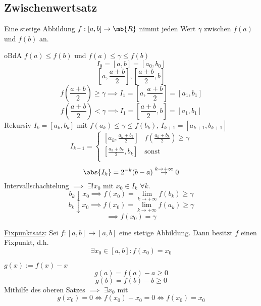 \subsection{Zwischenwertsatz}
\begin{Sat}
  Eine stetige Abbildung $f:[a,b]\to\mb{R}$ nimmt jeden Wert $\gamma$ zwischen $f(a)$ und $f(b)$ an.
\end{Sat}
\begin{Bew}
  oBdA $f(a)\leq f(b)$ und $f(a)\leq \gamma\leq f(b)$
  \[I_0=\left[ a,b \right]=\left[ a_0,b_0 \right]\]
  \[\left[ a,\frac{a+b}{2} \right],\left[ \frac{a+b}{2},b \right]\]
  \[f\left( \frac{a+b}{2} \right)\geq\gamma\implies I_1=\left[ a,\frac{a+b}{2} \right]=\left[ a_1,b_1 \right]\]
  \[f\left( \frac{a+b}{2} \right)<\gamma\implies I_1=\left[ \frac{a+b}{2},b \right]=\left[ a_1,b_1 \right]\]
  Rekursiv $I_k=\left[ a_k,b_k \right]$ mit $f(a_k)\leq\gamma\leq f(b_k)$, $I_{k+1}=\left[ a_{k+1},b_{k+1} \right]$
  \[I_{k+1}=\begin{cases}
    \left[ a_k,\frac{a_k+b_k}{2} \right]&f\left( \frac{a_k+b_k}{2} \right)\geq\gamma\\
    \left[ \frac{a_k+b_k}{2},b_k \right]&\text{sonst}\\
  \end{cases}\]
  \[\abs{I_k}=2^{-k}(b-a)\stackrel{k\to+\infty}{\to}0\]
  Intervallschachtelung $\implies$ $\exists ! x_0$ mit $x_0\in I_k$ $\forall k$.
  \[b_k\downarrow x_0\implies f(x_0)=\lim_{k\to+\infty}f(b_k)\geq \gamma\]
  \[b_k\downarrow x_0\implies f(x_0)=\lim_{k\to+\infty}f(a_k)\geq \gamma\]
  \[\implies f(x_0)=\gamma\]
\end{Bew}
\begin{Kor}
  \ul{Fixpunktsatz}: Sei $f:\left[ a,b \right]\to\left[ a,b \right]$ eine stetige Abbildung. Dann besitzt $f$ einen Fixpunkt, d.h.
  \[\exists x_0\in\left[ a,b \right]:f(x_0)=x_0\]
\end{Kor}
\begin{Bew}
  $g(x):=f(x)-x$
  \[g(a)=f(a)-a\geq 0\]
  \[g(b)=f(b)-b\geq 0\]
  Mithilfe des oberen Satzes $\implies$ $\exists x_0$ mit 
  \[g(x_0)=0\iff f(x_0)-x_0=0\iff f(x_0)=x_0\]
\end{Bew}
